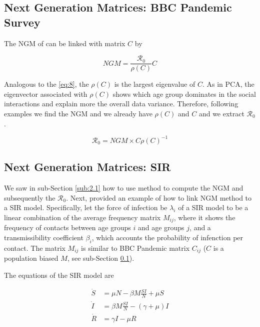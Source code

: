 \documentclass[12pt]{article}
\begin{document}
\subsection{Next Generation Matrices: BBC Pandemic Survey}
\label{sub:2.2}

The NGM of \cite{Diekmann:2010} can be linked with \cite{Klepac2020} matrix $C$ by 

\begin{equation}
NGM  = \frac{\mathcal{R}_{0}}{\rho(C)} C
\end{equation}

Analogous to the \ref{eq:8}, the $\rho(C)$ is the largest eigenvalue of $C$. As in PCA, the eigenvector associated with $\rho(C)$ shows which age group dominates in the social interactions and explain more the overall data variance. Therefore, following \cite{Diekmann:2010} examples we find the NGM and we already have $\rho(C)$ and $C$ and we extract $\mathcal{R}_{0}$.

\begin{equation}
\mathcal{R}_{0} = NGM \times C \rho(C)^{-1}
\label{eq:9}
\end{equation}

\subsection{Next Generation Matrices: SIR}
\label{sub:2.3}

We saw in sub-Section \ref{sub:2.1} how to use \cite{Diekmann:2010} method to compute the NGM and subsequently the $\mathcal{R}_{0}$. Next, \cite[p.4]{Fumanelli:2012} provided an example of how to link \cite{Diekmann:2010} NGM method to a SIR model. Specifically, let the force of infection be $\lambda_{i}$ of a SIR model to be a linear combination of the average frequency matrix $M_{ij}$, where it shows the frequency of contacts between age groups $i$ and age groups $j$, and a  transmissibility coefficient $\beta_{i}$, which accounts the probability of infenction per contact. The matrix $M_{ij}$ is similar to BBC Pandemic \cite{Klepac2020} matrix $C_{ij}$ ($C$ is a population biased $M$, see sub-Section \ref{sub:2.2}). 

The equations of the SIR model are

\begin{align*}
\dot{S} & =  \mu N - \beta M\frac{SI}{N} + \mu S\\
\dot{I}  & =  \beta M\frac{SI}{N} - (\gamma + \mu) I  \\
\dot{R}  & =  \gamma I - \mu R
\end{align*}
\end{document}
